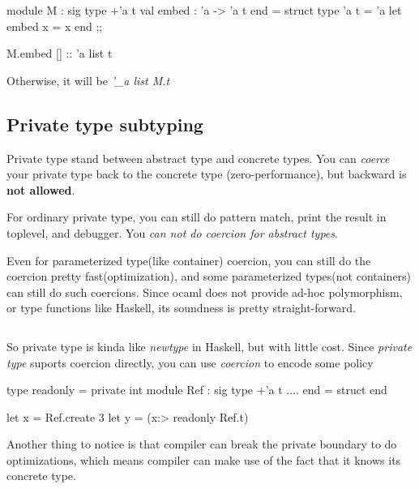 \begin{ocamlcode}
  module M : sig
  type +'a t
  val embed : 'a -> 'a t 
 end = struct
  type 'a t = 'a
  let embed x = x
 end ;;
\end{ocamlcode}

\begin{ocamlcode}
  M.embed [] :: 'a list t 
\end{ocamlcode}
Otherwise, it will be \textit{'\_a list M.t}


\subsection{Private type subtyping}
\label{sec:priv-type-subtyp}

Private type stand between abstract type and concrete types. You can
\textit{coerce} your private type back to the concrete type
(zero-performance), but backward is \textbf{not allowed}.

For ordinary private type, you can still do pattern match, print the
result in toplevel, and debugger. You \textit{can not do coercion for abstract
types}.

Even for parameterized type(like container) coercion, you can still do
the coercion pretty fast(optimization), and some parameterized
types(not containers) can still do such coercions.  Since ocaml does
not provide ad-hoc polymorphism, or type functions like Haskell, its
soundness is pretty straight-forward.

\inputminted[fontsize=\scriptsize,linenos=true ]{ocaml}{code/types/priv.ml}

So private type is kinda like \textit{newtype} in Haskell, but with
little cost. Since \textit{private type} suports coercion directly,
you can use \textit{coercion} to encode some policy

\begin{ocamlcode}
  type readonly = private int 
  module Ref : sig
    type  +'a t
    .... 
  end = struct
  end
  
  let x = Ref.create 3
  let y = (x:> readonly Ref.t)
\end{ocamlcode}

Another thing to notice is that compiler can break the private
boundary to do optimizations, which means compiler can make use of the
fact that it knows its concrete type.



